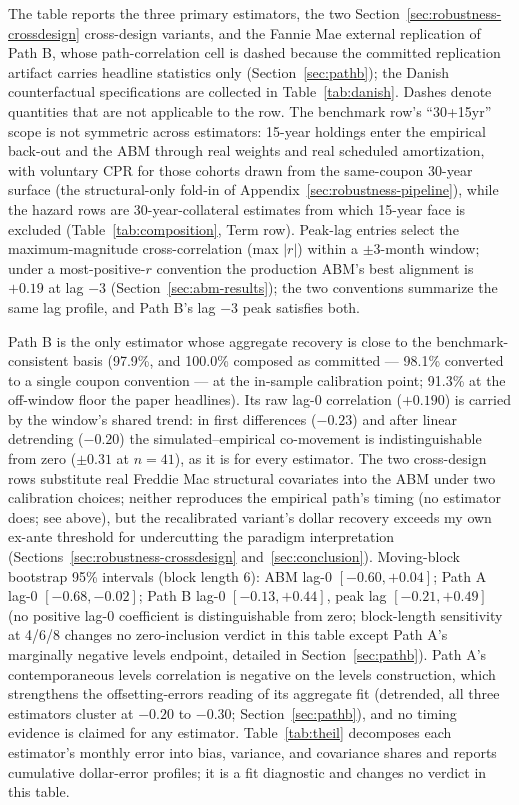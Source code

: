 \documentclass[12pt]{article}
\begin{document}
\begin{table}[!tp]
\begin{threeparttable}
\begin{tablenotes}[flushleft]\scriptsize
\item The table reports the three primary estimators, the two Section~\ref{sec:robustness-crossdesign} cross-design variants, and the Fannie Mae external replication of Path B, whose path-correlation cell is dashed because the committed replication artifact carries headline statistics only (Section~\ref{sec:pathb}); the Danish counterfactual specifications are collected in Table~\ref{tab:danish}. Dashes denote quantities that are not applicable to the row. The benchmark row's ``30+15yr'' scope is not symmetric across estimators: 15-year holdings enter the empirical back-out and the ABM through real weights and real scheduled amortization, with voluntary CPR for those cohorts drawn from the same-coupon 30-year surface (the structural-only fold-in of Appendix~\ref{sec:robustness-pipeline}), while the hazard rows are 30-year-collateral estimates from which 15-year face is excluded (Table~\ref{tab:composition}, Term row). Peak-lag entries select the maximum-magnitude cross-correlation (max $|r|$) within a $\pm$3-month window; under a most-positive-$r$ convention the production ABM's best alignment is $+0.19$ at lag $-3$ (Section~\ref{sec:abm-results}); the two conventions summarize the same lag profile, and Path B's lag $-3$ peak satisfies both.
\item Path B is the only estimator whose aggregate recovery is close to the benchmark-consistent basis (97.9\%, and 100.0\% composed as committed --- 98.1\% converted to a single coupon convention --- at the in-sample calibration point; 91.3\% at the off-window floor the paper headlines). Its raw lag-0 correlation ($+0.190$) is carried by the window's shared trend: in first differences ($-0.23$) and after linear detrending ($-0.20$) the simulated--empirical co-movement is indistinguishable from zero ($\pm 0.31$ at $n = 41$), as it is for every estimator. The two cross-design rows substitute real Freddie Mac structural covariates into the ABM under two calibration choices; neither reproduces the empirical path's timing (no estimator does; see above), but the recalibrated variant's dollar recovery exceeds my own ex-ante threshold for undercutting the paradigm interpretation (Sections~\ref{sec:robustness-crossdesign} and~\ref{sec:conclusion}). Moving-block bootstrap 95\% intervals (block length 6): ABM lag-0 $[-0.60, +0.04]$; Path A lag-0 $[-0.68, -0.02]$; Path B lag-0 $[-0.13, +0.44]$, peak lag $[-0.21, +0.49]$ (no positive lag-0 coefficient is distinguishable from zero; block-length sensitivity at 4/6/8 changes no zero-inclusion verdict in this table except Path A's marginally negative levels endpoint, detailed in Section~\ref{sec:pathb}). Path A's contemporaneous levels correlation is negative on the levels construction, which strengthens the offsetting-errors reading of its aggregate fit (detrended, all three estimators cluster at $-0.20$ to $-0.30$; Section~\ref{sec:pathb}), and no timing evidence is claimed for any estimator. Table~\ref{tab:theil} decomposes each estimator's monthly error into bias, variance, and covariance shares and reports cumulative dollar-error profiles; it is a fit diagnostic and changes no verdict in this table.

\end{tablenotes}
\end{threeparttable}
\end{table}
\end{document}
